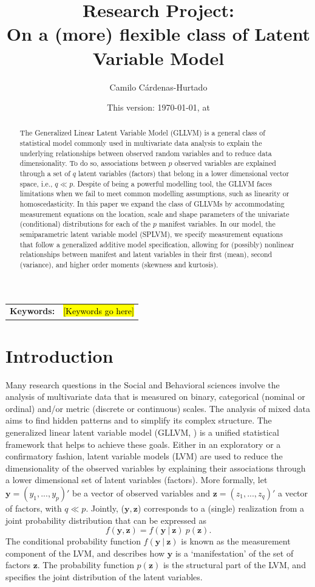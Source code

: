 \documentclass[11pt, a4paper]{article}
\title{Research Project:\\On a (more) flexible class of Latent Variable Model}
\author{Camilo Cárdenas-Hurtado}%
\date{This version: \longdate \today, at \currenttime}
\newcommand{\cond}{\!~|~\!}
\providecommand{\keywords}[1]{
\begin{tabular}{r p{10cm}}
\textbf{Keywords:} & #1
\end{tabular}}
\begin{document}
\maketitle

\begin{abstract}
The Generalized Linear Latent Variable Model (GLLVM) is a general class of statistical model commonly used in multivariate data analysis to explain the underlying relationships between observed random variables and to reduce data dimensionality. To do so, associations between $p$ observed variables are explained through a set of $q$ latent variables (factors) that belong in a lower dimensional vector space, i.e., $q \ll p$. Despite of being a powerful modelling tool, the GLLVM faces limitations when we fail to meet common modelling assumptions, such as linearity or homoscedasticity. In this paper we expand the class of GLLVMs by accommodating measurement equations on the location, scale and shape parameters of the univariate (conditional) distributions for each of the $p$ manifest variables. In our model, the semiparametric latent variable model (SPLVM), we specify measurement equations that follow a generalized additive model specification, allowing for (possibly) nonlinear relationships between manifest and latent variables in their first (mean), second (variance), and higher order moments (skewness and kurtosis).
\end{abstract}

\keywords{\hl{[Keywords go here]}}

\section{Introduction}

Many research questions in the Social and Behavioral sciences involve the analysis of multivariate data that is measured on binary, categorical (nominal or ordinal) and/or metric (discrete or continuous) scales. The analysis of mixed data aims to find hidden patterns and to simplify its complex structure. The generalized linear latent variable model (GLLVM, \citealp{BKM2011}) is a unified statistical framework that helps to achieve these goals. Either in an exploratory or a confirmatory fashion, latent variable models (LVM) are used to reduce the dimensionality of the observed variables by explaining their associations through a lower dimensional set of latent variables (factors). More formally, let $\mathbf{y} = (y_1,...,y_p)'$ be a vector of observed variables and $\mathbf{z} = (z_1,...,z_q)'$ a vector of factors, with $q \ll p$. Jointly, ($\mathbf{y}, \mathbf{z}$) corresponds to a (single) realization from a joint probability distribution that can be expressed as
\begin{equation}
 f(\mathbf{y}, \mathbf{z}) = f(\mathbf{y}\cond\mathbf{z})~p(\mathbf{z}). \label{eq:thLVM}
\end{equation}
The conditional probability function $f(\mathbf{y}\cond \mathbf{z})$ is known as the measurement component of the LVM, and describes how $\mathbf{y}$ is a `manifestation' of the set of factors $\mathbf{z}$. The probability function $p(\mathbf{z})$ is the structural part of the LVM, and specifies the joint distribution of the latent variables.
\end{document}
